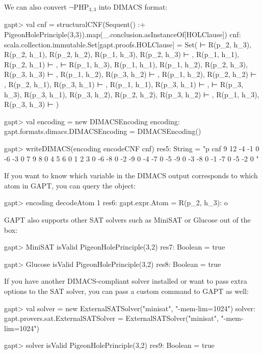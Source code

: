 \documentclass[a4paper,11pt]{book}
\newcommand{\cli}[1]{{\ttfamily {#1}}}
\begin{document}
We can also convert $\neg\mathrm{PHP}_{3,3}$ into DIMACS format:
\begin{clilisting}
gapt> val cnf = structuralCNF(Sequent() :+ PigeonHolePrinciple(3,3)).map(_.conclusion.asInstanceOf[HOLClause])
cnf: scala.collection.immutable.Set[gapt.proofs.HOLClause] = Set( ⊢ R(p_2, h_3), R(p_2, h_1), R(p_2, h_2), R(p_1, h_3), R(p_2, h_3) ⊢ , R(p_1, h_1), R(p_2, h_1) ⊢ ,  ⊢ R(p_1, h_3), R(p_1, h_1), R(p_1, h_2), R(p_2, h_3), R(p_3, h_3) ⊢ , R(p_1, h_2), R(p_3, h_2) ⊢ , R(p_1, h_2), R(p_2, h_2) ⊢ , R(p_2, h_1), R(p_3, h_1) ⊢ , R(p_1, h_1), R(p_3, h_1) ⊢ ,  ⊢ R(p_3, h_3), R(p_3, h_1), R(p_3, h_2), R(p_2, h_2), R(p_3, h_2) ⊢ , R(p_1, h_3), R(p_3, h_3) ⊢ )

gapt> val encoding = new DIMACSEncoding
encoding: gapt.formats.dimacs.DIMACSEncoding = DIMACSEncoding()

gapt> writeDIMACS(encoding encodeCNF cnf)
res5: String =
"p cnf 9 12
-4 -1 0
-6 -3 0
7 9 8 0
4 5 6 0
1 2 3 0
-6 -8 0
-2 -9 0
-4 -7 0
-5 -9 0
-3 -8 0
-1 -7 0
-5 -2 0
"

\end{clilisting}

If you want to know which variable in the DIMACS output corresponds to which
atom in GAPT, you can query the \cli{DIMACSEncoding} object:
\begin{clilisting}
gapt> encoding decodeAtom 1
res6: gapt.expr.Atom = R(p_2, h_3): o

\end{clilisting}

GAPT also supports other SAT solvers such as MiniSAT or Glucose out of the box:
\begin{clilisting}
gapt> MiniSAT isValid PigeonHolePrinciple(3,2)
res7: Boolean = true

\end{clilisting}
\begin{clilisting}
gapt> Glucose isValid PigeonHolePrinciple(3,2)
res8: Boolean = true

\end{clilisting}

If you have another DIMACS-compliant solver installed or want to pass extra
options to the SAT solver, you can pass a custom command to GAPT as well:
\begin{clilisting}
gapt> val solver = new ExternalSATSolver("minisat", "-mem-lim=1024")
solver: gapt.provers.sat.ExternalSATSolver = ExternalSATSolver("minisat", "-mem-lim=1024")

gapt> solver isValid PigeonHolePrinciple(3,2)
res9: Boolean = true

\end{clilisting}
\end{document}
